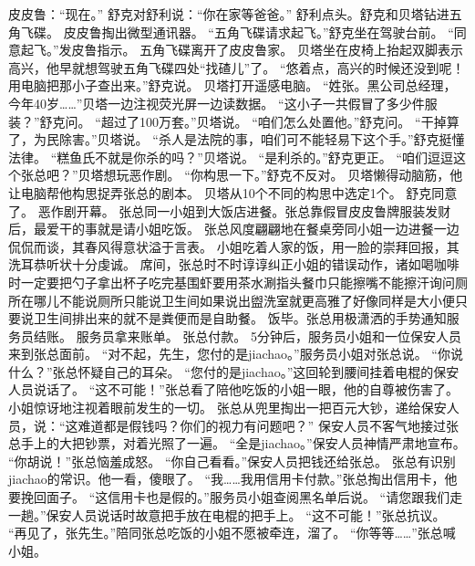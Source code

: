 \documentclass[a4paper,12pt,UTF8,twoside]{ctexbook}
\begin{document}
        皮皮鲁：“现在。” 
        舒克对舒利说：“你在家等爸爸。” 
        舒利点头。舒克和贝塔钻进五角飞碟。 
        皮皮鲁掏出微型通讯器。 
        “五角飞碟请求起飞。”舒克坐在驾驶台前。 
        “同意起飞。”发皮鲁指示。 
        五角飞碟离开了皮皮鲁家。 
        贝塔坐在皮椅上抬起双脚表示高兴，他早就想驾驶五角飞碟四处“找碴儿”了。 
        “悠着点，高兴的时候还没到呢！用电脑把那小子查出来。”舒克说。 
        贝塔打开遥感电脑。 
        “姓张。黑公司总经理，今年40岁……”贝塔一边注视荧光屏一边读数据。 
        “这小子一共假冒了多少件服装？”舒克问。 
        “超过了100万套。”贝塔说。 
        “咱们怎么处置他。”舒克问。 
        “干掉算了，为民除害。”贝塔说。 
        “杀人是法院的事，咱们可不能轻易下这个手。”舒克挺懂法律。 
        “糕鱼氏不就是你杀的吗？”贝塔说。 
        “是利杀的。”舒克更正。 
        “咱们逗逗这个张总吧？”贝塔想玩恶作剧。 
        “你构思一下。”舒克不反对。 
        贝塔懒得动脑筋，他让电脑帮他构思捉弄张总的剧本。 
        贝塔从10个不同的构思中选定1个。 
        舒克同意了。 
        恶作剧开幕。 
        张总同一小姐到大饭店进餐。张总靠假冒皮皮鲁牌服装发财后，最爱干的事就是请小姐吃饭。 
        张总风度翩翩地在餐桌旁同小姐一边进餐一边侃侃而谈，其春风得意状溢于言表。 
        小姐吃着人家的饭，用一脸的崇拜回报，其洗耳恭听状十分虔诚。 
        席间，张总时不时谆谆纠正小姐的错误动作，诸如喝咖啡时一定要把勺子拿出杯子吃完基围虾要用茶水涮指头餐巾只能擦嘴不能擦汗询问厕所在哪儿不能说厕所只能说卫生间如果说出盥洗室就更高雅了好像同样是大小便只要说卫生间排出来的就不是粪便而是自助餐。 
        饭毕。张总用极潇洒的手势通知服务员结账。 
        服务员拿来账单。 
        张总付款。 
        5分钟后，服务员小姐和一位保安人员来到张总面前。 
        “对不起，先生，您付的是jiachao。”服务员小姐对张总说。 
        “你说什么？”张总怀疑自己的耳朵。 
        “您付的是jiachao。”这回轮到腰间挂着电棍的保安人员说话了。 
        “这不可能！”张总看了陪他吃饭的小姐一眼，他的自尊被伤害了。 
        小姐惊讶地注视着眼前发生的一切。 
        张总从兜里掏出一把百元大钞，递给保安人员，说：“这难道都是假钱吗？你们的视力有问题吧？” 
        保安人员不客气地接过张总手上的大把钞票，对着光照了一遍。 
        “全是jiachao。”保安人员神情严肃地宣布。 
        “你胡说！”张总恼羞成怒。 
        “你自己看看。”保安人员把钱还给张总。 
        张总有识别jiachao的常识。他一看，傻眼了。 
        “我……我用信用卡付款。”张总掏出信用卡，他要挽回面子。 
        “这信用卡也是假的。”服务员小姐查阅黑名单后说。 
        “请您跟我们走一趟。”保安人员说话时故意把手放在电棍的把手上。 
        “这不可能！”张总抗议。 
        “再见了，张先生。”陪同张总吃饭的小姐不愿被牵连，溜了。 
        “你等等……”张总喊小姐。 
\end{document}
